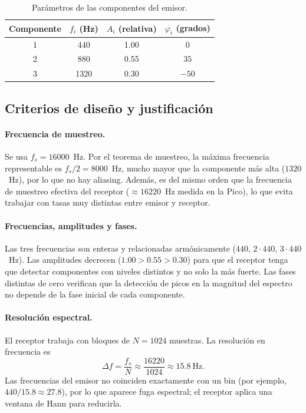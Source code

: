 \documentclass[11pt,a4paper]{article}
\begin{document}
\begin{table}[h]
  \centering
  \begin{tabular}{cccc}
    \toprule
    Componente & $f_i$ (Hz) & $A_i$ (relativa) & $\varphi_i$ (grados) \\
    \midrule
    1 & 440  & 1.00 & $0$   \\
    2 & 880  & 0.55 & $35$  \\
    3 & 1320 & 0.30 & $-50$ \\
    \bottomrule
  \end{tabular}
  \caption{Parámetros de las componentes del emisor.}
  \label{tab:param}
\end{table}

\subsection{Criterios de diseño y justificación}

\paragraph{Frecuencia de muestreo.}
Se usa $f_s = 16000$~Hz. Por el teorema de muestreo, la máxima frecuencia
representable es $f_s/2 = 8000$~Hz, mucho mayor que la componente más alta
($1320$~Hz), por lo que no hay aliasing. Además, es del mismo orden que la
frecuencia de muestreo efectiva del receptor ($\approx 16220$~Hz medida en
la Pico), lo que evita trabajar con tasas muy distintas entre emisor y
receptor.

\paragraph{Frecuencias, amplitudes y fases.}
Las tres frecuencias son enteras y relacionadas armónicamente
($440$, $2\cdot 440$, $3\cdot 440$~Hz). Las amplitudes decrecen
($1.00 > 0.55 > 0.30$) para que el receptor tenga que detectar componentes
con niveles distintos y no solo la más fuerte. Las fases distintas de cero
verifican que la detección de picos en la magnitud del espectro no depende
de la fase inicial de cada componente.

\paragraph{Resolución espectral.}
El receptor trabaja con bloques de $N = 1024$ muestras. La resolución en
frecuencia es
\begin{equation}
  \Delta f = \frac{f_s}{N} \approx \frac{16220}{1024} \approx 15.8\ \text{Hz}.
\end{equation}
Las frecuencias del emisor no coinciden exactamente con un bin
(por ejemplo, $440/15.8 \approx 27.8$), por lo que aparece fuga espectral;
el receptor aplica una ventana de Hann para reducirla.
\end{document}
